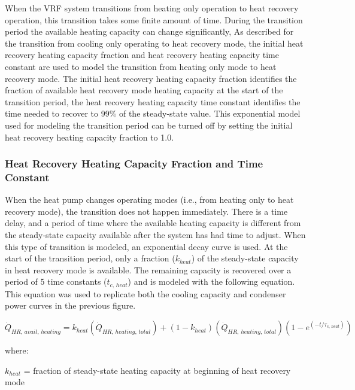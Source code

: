 When the VRF system transitions from heating only operation to heat recovery operation, this transition takes some finite amount of time. During the transition period the available heating capacity can change significantly, As described for the transition from cooling only operating to heat recovery mode, the initial heat recovery heating capacity fraction and heat recovery heating capacity time constant are used to model the transition from heating only mode to heat recovery mode. The initial heat recovery heating capacity fraction identifies the fraction of available heat recovery mode heating capacity at the start of the transition period, the heat recovery heating capacity time constant identifies the time needed to recover to 99\% of the steady-state value. This exponential model used for modeling the transition period can be turned off by setting the initial heat recovery heating capacity fraction to 1.0.

\subsubsection{Heat Recovery Heating Capacity Fraction and Time Constant}\label{heat-recovery-heating-capacity-fraction-and-time-constant}

When the heat pump changes operating modes (i.e., from heating only to heat recovery mode), the transition does not happen immediately. There is a time delay, and a period of time where the available heating capacity is different from the steady-state capacity available after the system has had time to adjust. When this type of transition is modeled, an exponential decay curve is used. At the start of the transition period, only a fraction (\(k_{heat}\)) of the steady-state capacity in heat recovery mode is available. The remaining capacity is recovered over a period of 5 time constants (\(t_{c,\, heat}\)) and is modeled with the following equation. This equation was used to replicate both the cooling capacity and condenser power curves in the previous figure.

\begin{equation}
  \dot{Q}_{HR,\,avail,\,heating} = k_{heat} \left( \dot{Q}_{HR,\,heating,\,total} \right) + \left( 1 - k_{heat} \right) \left( \dot{Q}_{HR,\,heating,\,total} \right) \left( 1 - e^{\left( -t / \tau_{c,\,heat} \right)} \right)
\end{equation}

where:

\(k_{heat}\) = fraction of steady-state heating capacity at beginning of heat recovery mode

